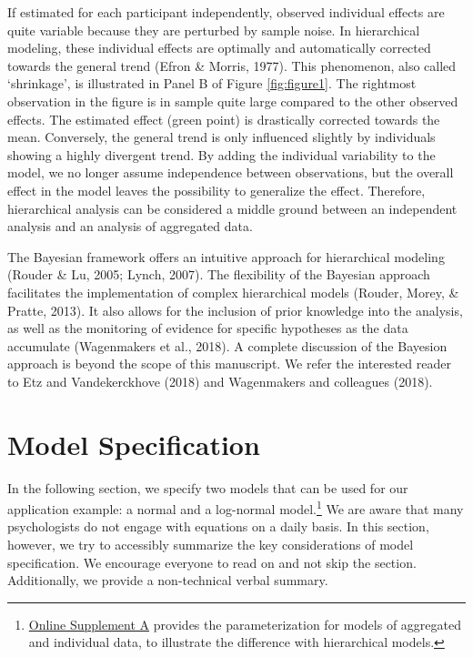 \documentclass[
  english,
  doc,floatsintext]{apa6}
\begin{document}
If estimated for each participant independently, observed individual effects are quite variable because they are perturbed by sample noise. In hierarchical modeling, these individual effects are optimally and automatically corrected towards the general trend (Efron \& Morris, 1977). This phenomenon, also called `shrinkage', is illustrated in Panel B of Figure \ref{fig:figure1}. The rightmost observation in the figure is in sample quite large compared to the other observed effects. The estimated effect (green point) is drastically corrected towards the mean. Conversely, the general trend is only influenced slightly by individuals showing a highly divergent trend. By adding the individual variability to the model, we no longer assume independence between observations, but the overall effect in the model leaves the possibility to generalize the effect. Therefore, hierarchical analysis can be considered a middle ground between an independent analysis and an analysis of aggregated data.

The Bayesian framework offers an intuitive approach for hierarchical modeling (Rouder \& Lu, 2005; Lynch, 2007). The flexibility of the Bayesian approach facilitates the implementation of complex hierarchical models (Rouder, Morey, \& Pratte, 2013). It also allows for the inclusion of prior knowledge into the analysis, as well as the monitoring of evidence for specific hypotheses as the data accumulate (Wagenmakers et al., 2018). A complete discussion of the Bayesion approach is beyond the scope of this manuscript. We refer the interested reader to Etz and Vandekerckhove (2018) and Wagenmakers and colleagues (2018).

\hypertarget{model-specification}{%
\section{Model Specification}\label{model-specification}}

In the following section, we specify two models that can be used for our application example: a normal and a log-normal model.\footnote{\href{https://github.com/MyrtheV/Bayesian-Hierarchical-Modelling-An-Introduction-and-Reassessment/blob/main/A\%20-\%20Model\%20Parameterization\%20/Online-Supplement-A---Model-Parameterization-for-Aggregated-and-Individual-Models.pdf}{Online Supplement A} provides the parameterization for models of aggregated and individual data, to illustrate the difference with hierarchical models.} We are aware that many psychologists do not engage with equations on a daily basis. In this section, however, we try to accessibly summarize the key considerations of model specification. We encourage everyone to read on and not skip the section. Additionally, we provide a non-technical verbal summary.
\end{document}
